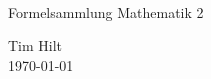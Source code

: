 \begin{titlepage}

  \\ \vspace{3cm}
  
  \begin{center}
    {
      \Huge Formelsammlung Mathematik 2}
    \vspace{0.5cm}
    
    \begin{Large}
      Tim Hilt\\
      \vspace{0.4cm}
      \today\\
    \end{Large}
    
  \end{center}
\end{titlepage}
\restoregeometry

